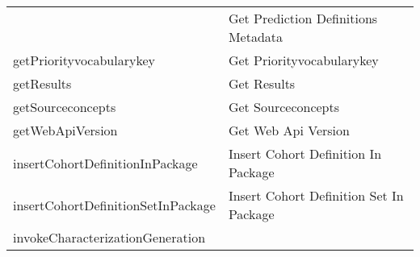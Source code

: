 \documentclass[
]{article}
\begin{document}
\begin{longtable}[]{@{}ll@{}}
\begin{minipage}[t]{0.46\columnwidth}
\end{minipage} & \begin{minipage}[t]{0.48\columnwidth}\raggedright
Get Prediction Definitions Metadata\strut
\end{minipage}\tabularnewline
\begin{minipage}[t]{0.46\columnwidth}\raggedright
getPriorityvocabularykey\strut
\end{minipage} & \begin{minipage}[t]{0.48\columnwidth}\raggedright
Get Priorityvocabularykey\strut
\end{minipage}\tabularnewline
\begin{minipage}[t]{0.46\columnwidth}\raggedright
getResults\strut
\end{minipage} & \begin{minipage}[t]{0.48\columnwidth}\raggedright
Get Results\strut
\end{minipage}\tabularnewline
\begin{minipage}[t]{0.46\columnwidth}\raggedright
getSourceconcepts\strut
\end{minipage} & \begin{minipage}[t]{0.48\columnwidth}\raggedright
Get Sourceconcepts\strut
\end{minipage}\tabularnewline
\begin{minipage}[t]{0.46\columnwidth}\raggedright
getWebApiVersion\strut
\end{minipage} & \begin{minipage}[t]{0.48\columnwidth}\raggedright
Get Web Api Version\strut
\end{minipage}\tabularnewline
\begin{minipage}[t]{0.46\columnwidth}\raggedright
insertCohortDefinitionInPackage\strut
\end{minipage} & \begin{minipage}[t]{0.48\columnwidth}\raggedright
Insert Cohort Definition In Package\strut
\end{minipage}\tabularnewline
\begin{minipage}[t]{0.46\columnwidth}\raggedright
insertCohortDefinitionSetInPackage\strut
\end{minipage} & \begin{minipage}[t]{0.48\columnwidth}\raggedright
Insert Cohort Definition Set In Package\strut
\end{minipage}\tabularnewline
\begin{minipage}[t]{0.46\columnwidth}\raggedright
invokeCharacterizationGeneration\strut
\end{minipage} & \begin{minipage}[t]{0.48\columnwidth}\raggedright

\end{minipage}
\end{longtable}
\end{document}
